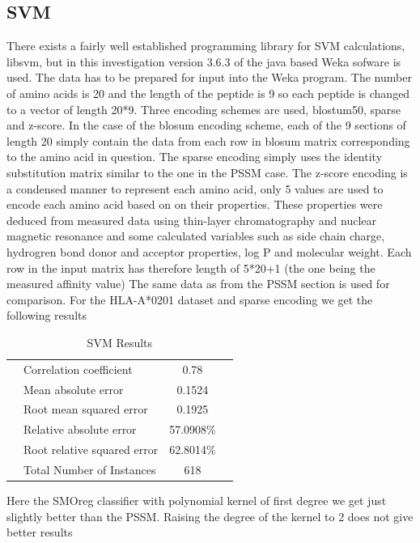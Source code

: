 \subsection*{SVM}
There exists a fairly well established programming library for SVM calculations, libsvm, but in this investigation version 3.6.3 of the java based Weka sofware is used. 
The data has to be prepared for input into the Weka program. 
The number of amino acids is 20 and the length of the peptide is 9 so each peptide is changed to a vector of length 20*9. 
Three encoding schemes are used, blostum50, sparse and z-score. 
In the case of the blosum encoding scheme, each of the 9 sections of length 20 simply contain the data from each row in blosum matrix corresponding to the amino acid in question.
The sparse encoding simply uses the identity substitution matrix similar to the one in the PSSM case. 
The z-score encoding is a condensed manner to represent each amino acid, only 5 values are used to encode each amino acid based on on their properties. 
These properties were deduced from measured data using thin-layer chromatography and nuclear magnetic resonance and some calculated variables 
such as side chain charge, hydrogren bond donor and acceptor properties, log P and molecular weight. 
Each row in the input matrix has therefore length of 5*20+1 (the one being the measured affinity value)
The same data as from the PSSM section is used for comparison. For the HLA-A*0201 dataset and sparse encoding we get the following results

\begin{table}[ht]
\begin{center}
\begin{tabular}{ ll c r }
\hline
 & Correlation coefficient &                 0.78  \\
 & Mean absolute error      &                0.1524 \\
 & Root mean squared error   &               0.1925 \\
 & Relative absolute error    &             57.0908\%  \\
 & Root relative squared error &            62.8014\%  \\
 & Total Number of Instances    &          618 \\
\hline
\end{tabular}
\label{fig:svm1}
\caption{SVM Results}
\end{center}
\end{table}


Here the SMOreg classifier with polynomial kernel of first degree we get just slightly better than the PSSM. Raising the degree of the kernel to 2 does not give better results

